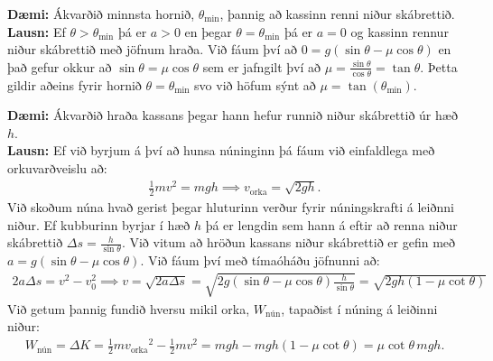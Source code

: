 \textbf{Dæmi:} Ákvarðið minnsta hornið, $\theta_{\text{min}}$, þannig að kassinn renni niður skábrettið. \\

\textbf{Lausn:} Ef $\theta > \theta_{\text{min}}$ þá er $a > 0$ en þegar $\theta = \theta_{\text{min}}$ þá er $a = 0$ og kassinn rennur niður skábrettið með jöfnum hraða. Við fáum því að $0 = g(\sin\theta - \mu \cos\theta)$ en það gefur okkur að $\sin\theta = \mu \cos\theta$ sem er jafngilt því að $\mu = \frac{\sin\theta}{\cos\theta} = \tan\theta$. Þetta gildir aðeins fyrir hornið $\theta = \theta_{\text{min}}$ svo við höfum sýnt að $\mu = \tan(\theta_{\text{min}})$.

\textbf{Dæmi:} Ákvarðið hraða kassans þegar hann hefur runnið niður skábrettið úr hæð $h$. \\

\textbf{Lausn:} Ef við byrjum á því að hunsa núninginn þá fáum við einfaldlega með orkuvarðveislu að:
\begin{align*}
    \frac{1}{2}mv^2 = mgh \implies v_{\text{orka}} = \sqrt{2gh}.
\end{align*}
Við skoðum núna hvað gerist þegar hluturinn verður fyrir núningskrafti á leiðnni niður. Ef kubburinn byrjar í hæð $h$ þá er lengdin sem hann á eftir að renna niður skábrettið $\Delta s = \frac{h}{\sin\theta}$. Við vitum að hröðun kassans niður skábrettið er gefin með $a = g(\sin\theta - \mu \cos\theta)$. Við fáum því með tímaóháðu jöfnunni að:
\begin{align*}
    2a \Delta s = v^2 - v_0^2 \implies v = \sqrt{2a\Delta s} = \sqrt{2g(\sin\theta - \mu \cos\theta)\frac{h}{\sin\theta}} = \sqrt{2gh\left(1-\mu\cot\theta \right)}
\end{align*}
Við getum þannig fundið hversu mikil orka, $W_{\text{nún}}$, tapaðist í núning á leiðinni niður:
\begin{align*}
    W_{\text{nún}} = \Delta K = \frac{1}{2}m {v_{\text{orka}}}^2 - \frac{1}{2}mv^2 = mgh - mgh(1-\mu \cot\theta) = \mu \cot\theta \, mgh.
\end{align*}

